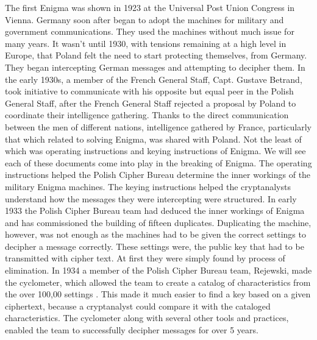 The first Enigma was shown in 1923 at the Universal Post Union Congress in Vienna. Germany soon after began to adopt the machines for military and government communications. They used the machines without much issue for many years. It wasn’t until 1930, with tensions remaining at a high level in Europe, that Poland felt the need to start protecting themselves, from Germany. They began intercepting German messages and attempting to decipher them. In the early 1930s, a member of the French General Staff, Capt. Gustave Betrand, took initiative to communicate with his opposite but equal peer in the Polish General Staff, after the French General Staff rejected a proposal by Poland to coordinate their intelligence gathering. Thanks to the direct communication between the men of different nations, intelligence gathered by France, particularly that which related to solving Enigma, was shared with Poland. Not the least of which was operating instructions and keying instructions of Enigma. We will see each of these documents come into play in the breaking of Enigma. The operating instructions helped the Polish Cipher Bureau determine the inner workings of the military Enigma machines. The keying instructions helped the cryptanalysts understand how the messages they were intercepting were structured. In early 1933 the Polish Cipher Bureau team had deduced the inner workings of Enigma and has commissioned the building of fifteen duplicates. Duplicating the machine, however, was not enough as the machines had to be given the correct settings to decipher a message correctly. These settings were, the public key that had to be transmitted with cipher text. At first they were simply found by process of elimination. In 1934 a member of the Polish Cipher Bureau team, Rejewski, made the cyclometer, which allowed the team to create a catalog of characteristics from the over 100,00 settings \cite{rfc01}. This made it much easier to find a key based on a given ciphertext, because a cryptanalyst could compare it with the cataloged characteristics. The cyclometer along with several other tools and practices, enabled the team to successfully decipher messages for over 5 years. 

